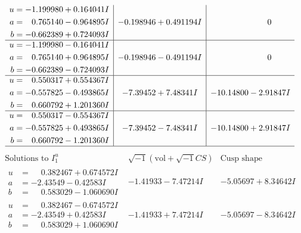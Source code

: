 \documentclass[1p]{elsarticle_modified}
\theoremstyle{definition}
\newcommand{\I}{\sqrt{-1}}
\begin{document}
$$\begin{array}{c|c|c}
\begin{aligned}
u &= -1.199980 + 0.164041 I \\
a &= \phantom{-}0.765140 - 0.964895 I \\
b &= -0.662389 + 0.724093 I\end{aligned}
 & -0.198946 + 0.491194 I & \phantom{-0.000000 } 0 \\ \hline\begin{aligned}
u &= -1.199980 - 0.164041 I \\
a &= \phantom{-}0.765140 + 0.964895 I \\
b &= -0.662389 - 0.724093 I\end{aligned}
 & -0.198946 - 0.491194 I & \phantom{-0.000000 } 0 \\ \hline\begin{aligned}
u &= \phantom{-}0.550317 + 0.554367 I \\
a &= -0.557825 - 0.493865 I \\
b &= \phantom{-}0.660792 + 1.201360 I\end{aligned}
 & -7.39452 + 7.48341 I & -10.14800 - 2.91847 I \\ \hline\begin{aligned}
u &= \phantom{-}0.550317 - 0.554367 I \\
a &= -0.557825 + 0.493865 I \\
b &= \phantom{-}0.660792 - 1.201360 I\end{aligned}
 & -7.39452 - 7.48341 I & -10.14800 + 2.91847 I\\
 \hline 
 \end{array}$$\newpage$$\begin{array}{c|c|c}  
\text{Solutions to }I^u_{1}& \I (\text{vol} + \sqrt{-1}CS) & \text{Cusp shape}\\
 \hline 
\begin{aligned}
u &= \phantom{-}0.382467 + 0.674572 I \\
a &= -2.43549 - 0.42583 I \\
b &= \phantom{-}0.583029 - 1.060690 I\end{aligned}
 & -1.41933 - 7.47214 I & -5.05697 + 8.34642 I \\ \hline\begin{aligned}
u &= \phantom{-}0.382467 - 0.674572 I \\
a &= -2.43549 + 0.42583 I \\
b &= \phantom{-}0.583029 + 1.060690 I\end{aligned}
 & -1.41933 + 7.47214 I & -5.05697 - 8.34642 I \\ \hline\begin{aligned}

\end{aligned}
\end{array}$$
\end{document}
